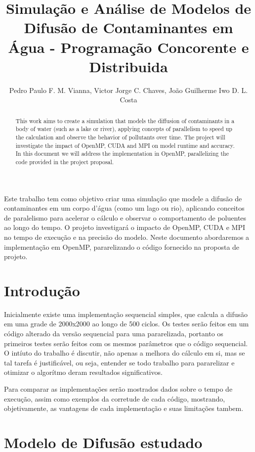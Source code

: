 \documentclass[12pt]{article}
\title{Simulação e Análise de Modelos de Difusão de Contaminantes em Água
 - Programação Concorente e Distribuida}
\author{Pedro Paulo F. M. Vianna, Victor Jorge C. Chaves, João Guilherme Iwo D. L. Costa }
\begin{document}
 

\maketitle

\begin{abstract}
    This work aims to create a simulation that models the diffusion of contaminants in a body of water (such as a lake or river), applying concepts of parallelism to speed up the calculation and observe the behavior of pollutants over time. The project will investigate the impact of OpenMP, CUDA and MPI on model runtime and accuracy. In this document we will address the implementation in OpenMP, parallelizing the code provided in the project proposal.
\end{abstract}
     
\begin{resumo} 
  Este trabalho tem como objetivo criar uma simulação que modele a difusão de contaminantes em um corpo d'água (como um lago ou rio), aplicando conceitos de paralelismo para acelerar o cálculo e observar o comportamento de poluentes ao longo do tempo. O projeto investigará o impacto de OpenMP, CUDA e MPI no tempo de execução e na precisão do modelo. Neste documento abordaremos a implementação em OpenMP, pararelizando o código fornecido na proposta de projeto.
\end{resumo}


\section{Introdução}

Inicialmente existe uma implementação sequencial simples, que calcula a difusão em uma grade de 2000x2000 ao longo de 500 ciclos. Os testes serão feitos em um código alterado da versão sequencial para uma pararelizada, portanto os primeiros testes serão feitos com os mesmos parâmetros que o código sequencial. O intíuto do trabalho é discutir, não apenas a melhora do cálculo em si, mas se tal tarefa é justificável, ou seja, entender se todo trabalho para pararelizar e otimizar o algorítmo deram resultados significativos.

Para comparar as implementações serão mostrados dados sobre o tempo de execução, assim como exemplos da corretude de cada código, mostrando, objetivamente, as vantagens de cada implementação e suas limitações tambem.

\section{Modelo de Difusão estudado} \label{sec:firstpage}
\end{document}
